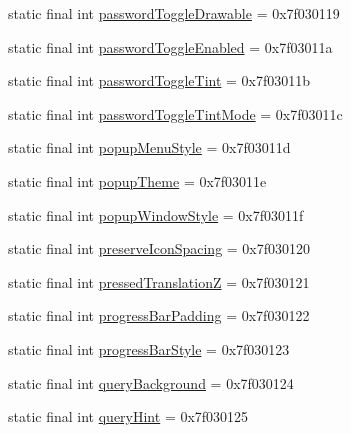 \begin{DoxyCompactItemize}
\item 
static final int \mbox{\hyperlink{classandroid_1_1support_1_1design_1_1R_1_1attr_ad34751d242f81fd15023ea0c9098b41b}{password\+Toggle\+Drawable}} = 0x7f030119
\item 
static final int \mbox{\hyperlink{classandroid_1_1support_1_1design_1_1R_1_1attr_a4ceee1c320b22ad02f77a85e0ccc11d6}{password\+Toggle\+Enabled}} = 0x7f03011a
\item 
static final int \mbox{\hyperlink{classandroid_1_1support_1_1design_1_1R_1_1attr_aa16735a90d99a10e9b107a62d47899c3}{password\+Toggle\+Tint}} = 0x7f03011b
\item 
static final int \mbox{\hyperlink{classandroid_1_1support_1_1design_1_1R_1_1attr_adc4fadcdc73f67a83d221e68549b5d6b}{password\+Toggle\+Tint\+Mode}} = 0x7f03011c
\item 
static final int \mbox{\hyperlink{classandroid_1_1support_1_1design_1_1R_1_1attr_ab8c4bcc320670a9a91d34689dd5613e6}{popup\+Menu\+Style}} = 0x7f03011d
\item 
static final int \mbox{\hyperlink{classandroid_1_1support_1_1design_1_1R_1_1attr_a0fa86fecf0709d268738146b4e2bae6a}{popup\+Theme}} = 0x7f03011e
\item 
static final int \mbox{\hyperlink{classandroid_1_1support_1_1design_1_1R_1_1attr_a9fd9d37846cc33aa761d2e36a682d82d}{popup\+Window\+Style}} = 0x7f03011f
\item 
static final int \mbox{\hyperlink{classandroid_1_1support_1_1design_1_1R_1_1attr_aa46bd1c2da48c73b677e7c879334e44a}{preserve\+Icon\+Spacing}} = 0x7f030120
\item 
static final int \mbox{\hyperlink{classandroid_1_1support_1_1design_1_1R_1_1attr_af8a71cbe4f9675d0ccb188419119d859}{pressed\+TranslationZ}} = 0x7f030121
\item 
static final int \mbox{\hyperlink{classandroid_1_1support_1_1design_1_1R_1_1attr_afa9abb508c16f8f259a7a135620799c3}{progress\+Bar\+Padding}} = 0x7f030122
\item 
static final int \mbox{\hyperlink{classandroid_1_1support_1_1design_1_1R_1_1attr_ac2e0d8d03a6e205fa686581d6af25372}{progress\+Bar\+Style}} = 0x7f030123
\item 
static final int \mbox{\hyperlink{classandroid_1_1support_1_1design_1_1R_1_1attr_a2403d7a3c33cba76857ac5c2d3a0a655}{query\+Background}} = 0x7f030124
\item 
static final int \mbox{\hyperlink{classandroid_1_1support_1_1design_1_1R_1_1attr_aaf177eb8b4898900e454469e4c906a16}{query\+Hint}} = 0x7f030125
\item 

\end{DoxyCompactItemize}
